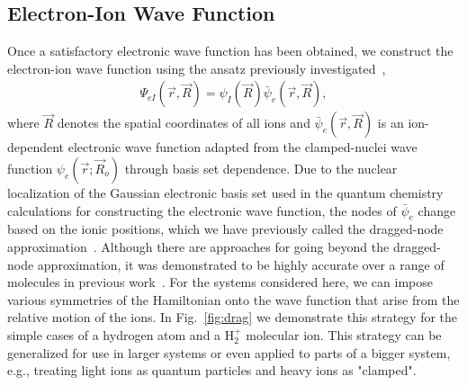 \documentclass[pra,superscriptaddress,groupedaddress,twocolumn]{revtex4}
\begin{document}
\subsection{Electron-Ion Wave Function}

Once a satisfactory electronic wave function has been obtained, we construct the electron-ion wave function using the ansatz previously investigated~\cite{Tubman_ECG},
\begin{align}
\Psi_{eI}(\vec{r},\vec{R})=\psi_I(\vec{R})\bar{\psi}_e(\vec{r},\vec{R}), \label{eq:psi}
\end{align}
where $\vec{R}$ denotes the spatial coordinates of all ions and $\bar{\psi}_e(\vec{r},\vec{R})$ is an ion-dependent electronic wave function adapted from the clamped-nuclei wave function $\psi_e(\vec{r};\vec{R}_o)$ through basis set dependence. Due to the nuclear localization of the Gaussian electronic basis set used in the quantum chemistry calculations for constructing the electronic wave function, the nodes of $\bar{\psi}_e$ change based on the ionic positions, which we have previously called the dragged-node approximation~\cite{Tubman_ECG}. 
Although there are approaches for going beyond the dragged-node approximation, it was demonstrated to be highly accurate over a range of molecules in previous work~\cite{Tubman_ECG}. For the systems considered here, we can impose various symmetries of the Hamiltonian onto the wave function that arise from the relative motion of the ions. In Fig.~\ref{fig:drag} we demonstrate this strategy for the simple cases of a hydrogen atom and a H$_2^+$ molecular ion. This strategy can be generalized for use in larger systems or even applied to parts of a bigger system, e.g., treating light ions as quantum particles and heavy ions as "clamped".
\end{document}
